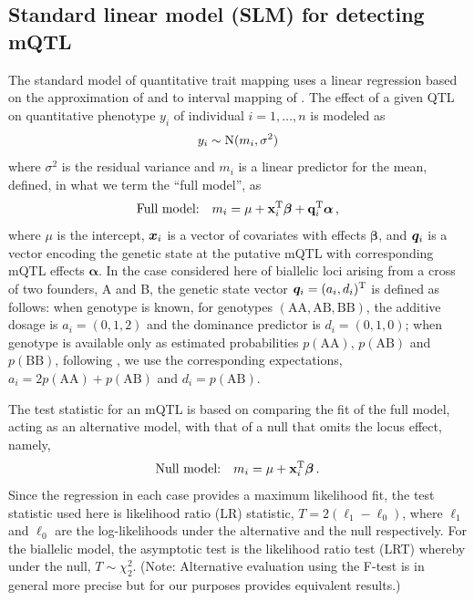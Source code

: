 \subsection{Standard linear model (SLM) for detecting mQTL}

  The standard model of quantitative trait mapping uses a linear regression based on the approximation of \cite{Haley1992} and \cite{Martinez1992} to interval mapping of \cite{Lander1989a}.
  The effect of a given QTL on quantitative phenotype $y_i$ of individual $i=1,\dots,n$ is modeled as
  \begin{align}
    y_i \sim \mathrm{N}(m_i, \sigma^2)
  \end{align}
  where $\sigma^2$ is the residual variance and $m_i$ is a linear predictor for the mean, defined, in what we term the ``full model'', as
  \begin{equation}
    \text{Full model:} \quad  m_i = \mu + \mathbf{x}_i^\mathrm{T}\bm{\beta} + \mathbf{q}_i^\mathrm{T}\bm{\alpha}\,,
    \label{eq:slm-alt}    
  \end{equation}
  where $\mu$ is the intercept, $\bm{x}_i$ is a vector of covariates with effects $\bm{\beta}$, and $\bm{q}_i$ is a vector encoding the genetic state at the putative mQTL with corresponding mQTL effects $\bm{\alpha}$.
  In the case considered here of biallelic loci arising from a cross of two founders, A and B, the genetic state vector $\bm{q}_i=(a_i,d_i)^\mathrm{T}$ is defined as follows: when genotype is known, for genotypes $(\text{AA},\text{AB}, \text{BB})$, the additive dosage is $a_i=(0,1,2)$ and the dominance predictor is $d_i=(0,1,0)$; when genotype is available only as estimated probabilities $p(\text{AA})$, $p(\text{AB})$ and $p(\text{BB})$, following \citep{Haley1992,Martinez1992}, we use the corresponding expectations, $a_i=2p(\text{AA})+p(\text{AB})$ and $d_i=p(\text{AB})$.

  The test statistic for an mQTL is based on comparing the fit of the full model, acting as an alternative model, with that of a null that omits the locus effect, namely,
  \begin{equation}
    \text{Null model:}\quad  m_i = \mu + \mathbf{x}_i^\mathrm{T}\bm{\beta} \,.\label{eq:slm-null}
  \end{equation}
  Since the regression in each case provides a maximum likelihood fit, the test statistic used here is likelihood ratio (LR) statistic, $T=2(\ell_1-\ell_0)$, where $\ell_1$ and $\ell_0$ are the log-likelihoods under the alternative and the null respectively. For the biallelic model, the asymptotic test is the likelihood ratio test (LRT) whereby under the null, $T\sim\chi^2_2$. (Note: Alternative evaluation using the F-test is in general more precise but for our purposes provides equivalent results.)

